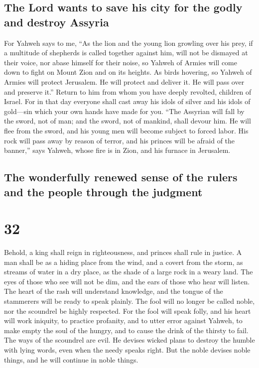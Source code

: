 \hypertarget{the-lord-wants-to-save-his-city-for-the-godly-and-destroy-assyria}{%
\subsection{The Lord wants to save his city for the godly and destroy
Assyria}\label{the-lord-wants-to-save-his-city-for-the-godly-and-destroy-assyria}}

 For Yahweh says to me, ``As the lion and the young lion
growling over his prey, if a multitude of shepherds is called together
against him, will not be dismayed at their voice, nor abase himself for
their noise, so Yahweh of Armies will come down to fight on Mount Zion
and on its heights.  As birds hovering, so Yahweh of
Armies will protect Jerusalem. He will protect and deliver it. He will
pass over and preserve it.''  Return to him from whom you
have deeply revolted, children of Israel.  For in that day
everyone shall cast away his idols of silver and his idols of gold---sin
which your own hands have made for you.  ``The Assyrian
will fall by the sword, not of man; and the sword, not of mankind, shall
devour him. He will flee from the sword, and his young men will become
subject to forced labor.  His rock will pass away by
reason of terror, and his princes will be afraid of the banner,'' says
Yahweh, whose fire is in Zion, and his furnace in Jerusalem.

\hypertarget{the-wonderfully-renewed-sense-of-the-rulers-and-the-people-through-the-judgment}{%
\subsection{The wonderfully renewed sense of the rulers and the people
through the
judgment}\label{the-wonderfully-renewed-sense-of-the-rulers-and-the-people-through-the-judgment}}

\hypertarget{section-31}{%
\section{32}\label{section-31}}

 Behold, a king shall reign in righteousness, and princes
shall rule in justice.  A man shall be as a hiding place
from the wind, and a covert from the storm, as streams of water in a dry
place, as the shade of a large rock in a weary land.  The
eyes of those who see will not be dim, and the ears of those who hear
will listen.  The heart of the rash will understand
knowledge, and the tongue of the stammerers will be ready to speak
plainly.  The fool will no longer be called noble, nor the
scoundrel be highly respected.  For the fool will speak
folly, and his heart will work iniquity, to practice profanity, and to
utter error against Yahweh, to make empty the soul of the hungry, and to
cause the drink of the thirsty to fail.  The ways of the
scoundrel are evil. He devises wicked plans to destroy the humble with
lying words, even when the needy speaks right.  But the
noble devises noble things, and he will continue in noble things.

